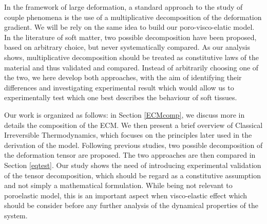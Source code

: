 In the framework of large deformation, a standard approach to the study of couple phenomena is the use of a multiplicative decomposition of the deformation gradient. We will be rely on the same idea to build our poro-visco-elatic model. In the literature of soft matter, two possible decomposition have been proposed, based on arbitrary choice, but never systematically compared. As our analysis shows, multiplicative decomposition should be treated as constitutive laws of the material and thus validated  and compared. Instead of arbitrarily choosing one of the two, we here develop both approaches, with the aim of identifying their differences and investigating experimental result which would allow us to experimentally test which one best describes the behaviour of soft tissues. 

Our work is organized as follows: in Section \ref{ECMcomp}, we discuss more in details the composition of the ECM. We then present a brief overview of Classical Irreversible Thermodynamics, which focuses on the principles later used in the derivation of the model. Following previous studies, two possible decomposition of the deformation tensor are proposed. The two approaches are then compared in Section \ref{eqtest}. Our study shows the need of introducing experimental validation of the tensor decomposition, which should be regard as a constitutive assumption and not simply a mathematical formulation. While being not relevant to poroelastic model, this is an important aspect when visco-elastic effect which should be consider before any further analysis of the dynamical properties of the system.